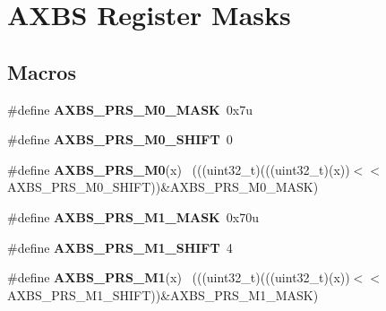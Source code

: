 \hypertarget{group___a_x_b_s___register___masks}{}\section{A\+X\+B\+S Register Masks}
\label{group___a_x_b_s___register___masks}
\subsection*{Macros}
\begin{DoxyCompactItemize}
\item 
\hypertarget{group___a_x_b_s___register___masks_ga9e794f0ace10f0e077a92ce9f5abbb41}{}\#define {\bfseries A\+X\+B\+S\+\_\+\+P\+R\+S\+\_\+\+M0\+\_\+\+M\+A\+S\+K}~0x7u\label{group___a_x_b_s___register___masks_ga9e794f0ace10f0e077a92ce9f5abbb41}

\item 
\hypertarget{group___a_x_b_s___register___masks_ga86a8f40f6a5d45cd4868dce4833a17d5}{}\#define {\bfseries A\+X\+B\+S\+\_\+\+P\+R\+S\+\_\+\+M0\+\_\+\+S\+H\+I\+F\+T}~0\label{group___a_x_b_s___register___masks_ga86a8f40f6a5d45cd4868dce4833a17d5}

\item 
\hypertarget{group___a_x_b_s___register___masks_ga6a2c79e55f5424e6d4e863a6f51c8250}{}\#define {\bfseries A\+X\+B\+S\+\_\+\+P\+R\+S\+\_\+\+M0}(x)                                                  ~(((uint32\+\_\+t)(((uint32\+\_\+t)(x))$<$$<$A\+X\+B\+S\+\_\+\+P\+R\+S\+\_\+\+M0\+\_\+\+S\+H\+I\+F\+T))\&A\+X\+B\+S\+\_\+\+P\+R\+S\+\_\+\+M0\+\_\+\+M\+A\+S\+K)\label{group___a_x_b_s___register___masks_ga6a2c79e55f5424e6d4e863a6f51c8250}

\item 
\hypertarget{group___a_x_b_s___register___masks_ga69131fbb37b2a3eef0e0f135e265e1c0}{}\#define {\bfseries A\+X\+B\+S\+\_\+\+P\+R\+S\+\_\+\+M1\+\_\+\+M\+A\+S\+K}~0x70u\label{group___a_x_b_s___register___masks_ga69131fbb37b2a3eef0e0f135e265e1c0}

\item 
\hypertarget{group___a_x_b_s___register___masks_gab293a628aa64a93c04ba49fd27326592}{}\#define {\bfseries A\+X\+B\+S\+\_\+\+P\+R\+S\+\_\+\+M1\+\_\+\+S\+H\+I\+F\+T}~4\label{group___a_x_b_s___register___masks_gab293a628aa64a93c04ba49fd27326592}

\item 
\hypertarget{group___a_x_b_s___register___masks_ga6ae77cbf64e41e6732945b6315dd3a7e}{}\#define {\bfseries A\+X\+B\+S\+\_\+\+P\+R\+S\+\_\+\+M1}(x)                                                  ~(((uint32\+\_\+t)(((uint32\+\_\+t)(x))$<$$<$A\+X\+B\+S\+\_\+\+P\+R\+S\+\_\+\+M1\+\_\+\+S\+H\+I\+F\+T))\&A\+X\+B\+S\+\_\+\+P\+R\+S\+\_\+\+M1\+\_\+\+M\+A\+S\+K)\label{group___a_x_b_s___register___masks_ga6ae77cbf64e41e6732945b6315dd3a7e}


\end{DoxyCompactItemize}
